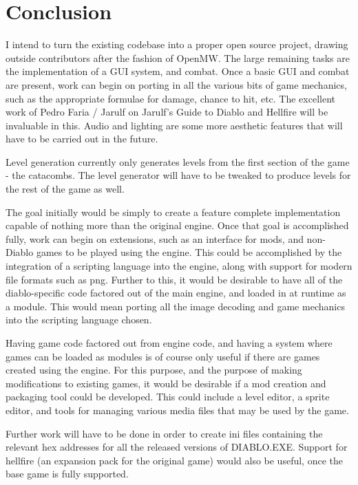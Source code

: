 	\chapter{Conclusion}
	I intend to turn the existing codebase into a proper open source project, drawing outside contributors after the fashion of OpenMW\cite{openmw}. The large remaining tasks are the implementation of a GUI system, and combat.
	Once a basic GUI and combat are present, work can begin on porting in all the various bits of game mechanics, such as the appropriate formulae for damage, chance to hit, etc. The excellent work of Pedro Faria / Jarulf on Jarulf's Guide to Diablo and Hellfire\cite{jarulf} will be invaluable in this.
	Audio and lighting are some more aesthetic features that will have to be carried out in the future.
	
	Level generation currently only generates levels from the first section of the game - the catacombs. The level generator will have to be tweaked to produce levels for the rest of the game as well.
	
	The goal initially would be simply to create a feature complete implementation capable of nothing more than the original engine. Once that goal is accomplished fully, work can begin on extensions, such as an interface for mods, and non-Diablo games to be played using the engine.
	This could be accomplished by the integration of a scripting language into the engine, along with support for modern file formats such as png. 
	Further to this, it would be desirable to have all of the diablo-specific code factored out of the main engine, and loaded in at runtime as a module. This would mean porting all the image decoding and game mechanics into the scripting language chosen.
	
 	Having game code factored out from engine code, and having a system where games can be loaded as modules is of course only useful if there are games created using the engine. For this purpose, and the purpose of making modifications to existing games, it would be desirable if a mod creation and packaging tool could be developed.
 	This could include a level editor, a sprite editor, and tools for managing various media files that may be used by the game.
 	
 	Further work will have to be done in order to create ini files containing the relevant hex addresses for all the released versions of DIABLO.EXE. Support for hellfire (an expansion pack for the original game) would also be useful, once the base game is fully supported.
	
